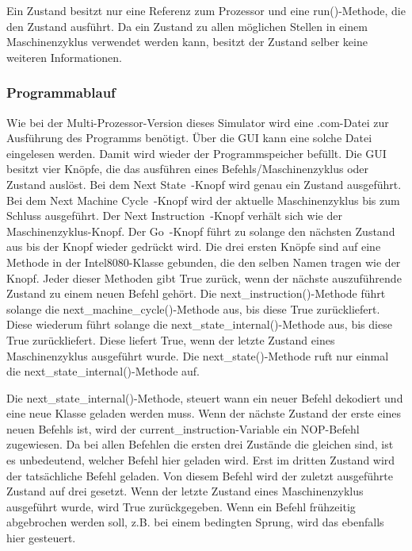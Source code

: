 \documentclass[12pt]{article}
\begin{document}
\noindent
Ein Zustand besitzt nur eine Referenz zum Prozessor und eine run()-Methode, die den Zustand ausführt. Da ein Zustand zu allen möglichen Stellen in einem Maschinenzyklus verwendet werden kann, besitzt der Zustand selber keine weiteren Informationen.


\subsubsection{Programmablauf}

Wie bei der Multi-Prozessor-Version dieses Simulator wird eine .com-Datei zur Ausführung des Programms benötigt. Über die GUI kann eine solche Datei eingelesen werden. Damit wird wieder der Programmspeicher befüllt.
Die GUI besitzt vier Knöpfe, die das ausführen eines Befehls/Maschinenzyklus oder Zustand auslöst. Bei dem \glqq Next State\grqq\ -Knopf wird genau ein Zustand ausgeführt. Bei dem \glqq Next Machine Cycle\grqq\ -Knopf wird der aktuelle Maschinenzyklus bis zum Schluss ausgeführt. Der  \glqq Next Instruction\grqq\ -Knopf verhält sich wie der Maschinenzyklus-Knopf. Der \glqq Go\grqq\ -Knopf führt zu solange den nächsten Zustand aus bis der Knopf wieder gedrückt wird. Die drei ersten Knöpfe sind auf eine Methode in der Intel8080-Klasse gebunden, die den selben Namen tragen wie der Knopf. Jeder dieser Methoden gibt True zurück, wenn der nächste auszuführende Zustand zu einem neuen Befehl gehört.
Die next\_instruction()-Methode führt solange die next\_machine\_cycle()-Methode aus, bis diese True zurückliefert. Diese wiederum führt solange die next\_state\_internal()-Methode aus, bis diese True zurückliefert. Diese liefert True, wenn der letzte Zustand eines Maschinenzyklus ausgeführt wurde. Die next\_state()-Methode ruft nur einmal die next\_state\_internal()-Methode auf.

\noindent
Die next\_state\_internal()-Methode, steuert wann ein neuer Befehl dekodiert und eine neue Klasse geladen werden muss. Wenn der nächste Zustand der erste eines neuen Befehls ist, wird der current\_instruction-Variable ein NOP-Befehl zugewiesen. Da bei allen Befehlen die ersten drei Zustände die gleichen sind, ist es unbedeutend, welcher Befehl hier geladen wird. Erst im dritten Zustand wird der tatsächliche Befehl geladen. Von diesem Befehl wird der zuletzt ausgeführte Zustand auf drei gesetzt. Wenn der letzte Zustand eines Maschinenzyklus ausgeführt wurde, wird True zurückgegeben. Wenn ein Befehl frühzeitig abgebrochen werden soll, z.B. bei einem bedingten Sprung, wird das ebenfalls hier gesteuert.
\end{document}
